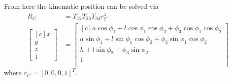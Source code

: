 \documentclass[onecolumn,10pt]{jhwhw}
\begin{document}
From here the kinematic position can be solved via
\begin{align*}
R_C &= T_{12} T_{23} T_{34} r_C^4 \\
\begin{bmatrix*}[c]
x \\
y \\
z \\
1
\end{bmatrix*} &=
\begin{bmatrix*}[c]
a \cos\phi_1 + l \cos\phi_1 \cos\phi_2 + \phi_3 \cos\phi_1 \cos\phi_2 \\
a \sin\phi_1 + l \sin\phi_1 \cos\phi_2 + \phi_3 \sin\phi_1 \cos\phi_2 \\
                              h + l \sin\phi_2 + \phi_3 \sin\phi_2 \\
                                                             1 \\
\end{bmatrix*}
\end{align*}
where $r_C = \left[0, 0, 0, 1 \right]^T$.
\end{document}
